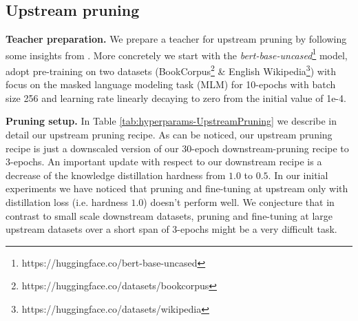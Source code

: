 \documentclass[11pt]{article}
\begin{document}
\subsection{Upstream pruning}
\label{app:hyperparams-UpstreamPruning}

\noindent\textbf{Teacher preparation.} We prepare a teacher for upstream pruning by following some insights from \cite{Liu2019RoBERTaAR}. More concretely we start with the \textit{bert-base-uncased}\footnote{https://huggingface.co/bert-base-uncased} model, adopt pre-training on two datasets (BookCorpus\footnote{https://huggingface.co/datasets/bookcorpus} \& English Wikipedia\footnote{https://huggingface.co/datasets/wikipedia}) with focus on the masked language modeling task (MLM) for 10-epochs with batch size 256 and learning rate linearly decaying to zero from the initial value of 1e-4. 

\noindent\textbf{Pruning setup.} In Table \ref{tab:hyperparams-UpstreamPruning} we describe in detail our upstream pruning recipe. As can be noticed, our upstream pruning recipe is just a downscaled version of our 30-epoch downstream-pruning recipe to 3-epochs. An important update with respect to our downstream recipe is a decrease of the knowledge distillation hardness from $1.0$ to $0.5$. In our initial experiments we have noticed that pruning and fine-tuning at upstream only with distillation loss (i.e. hardness $1.0$) doesn't perform well. We conjecture that in contrast to small scale downstream datasets, pruning and fine-tuning at large upstream datasets over a short span of 3-epochs might be a very difficult task. 
\end{document}
